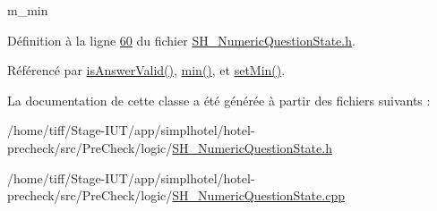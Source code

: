 m\-\_\-min 



Définition à la ligne \hyperlink{SH__NumericQuestionState_8h_source_l00060}{60} du fichier \hyperlink{SH__NumericQuestionState_8h_source}{S\-H\-\_\-\-Numeric\-Question\-State.\-h}.



Référencé par \hyperlink{classSH__NumericQuestionState_a3676dec63a4da7cecf3fc28d8a197843}{is\-Answer\-Valid()}, \hyperlink{classSH__NumericQuestionState_a0009413f1bd199864ad0ac5d4d7c4527}{min()}, et \hyperlink{classSH__NumericQuestionState_a8bd47f1f69fde0e4ac2ff8e90feb65a3}{set\-Min()}.



La documentation de cette classe a été générée à partir des fichiers suivants \-:\begin{DoxyCompactItemize}
\item 
/home/tiff/\-Stage-\/\-I\-U\-T/app/simplhotel/hotel-\/precheck/src/\-Pre\-Check/logic/\hyperlink{SH__NumericQuestionState_8h}{S\-H\-\_\-\-Numeric\-Question\-State.\-h}\item 
/home/tiff/\-Stage-\/\-I\-U\-T/app/simplhotel/hotel-\/precheck/src/\-Pre\-Check/logic/\hyperlink{SH__NumericQuestionState_8cpp}{S\-H\-\_\-\-Numeric\-Question\-State.\-cpp}\end{DoxyCompactItemize}
